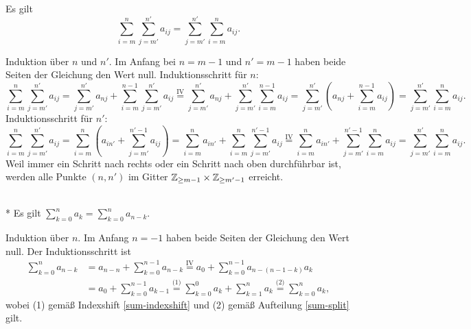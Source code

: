 \begin{Korollar} Es gilt
\[\sum_{i=m}^n \sum_{j=m'}^{n'} a_{ij} = \sum_{j=m'}^{n'}\sum_{i=m}^n a_{ij}.\]
\end{Korollar}
\begin{Beweis}
Induktion über $n$ und $n'$. Im Anfang bei $n=m-1$ und $n'=m-1$
haben beide Seiten der Gleichung den Wert null. Induktionsschritt für $n$:
\[\sum_{i=m}^n\sum_{j=m'}^{n'} a_{ij}
= \!\!\sum_{j=m'}^{n'} a_{nj}
+ \!\sum_{i=m}^{n-1}\sum_{j=m'}^{n'} a_{ij}
\stackrel{\mathrm{IV}}=
\!\sum_{j=m'}^{n'} a_{nj}
+ \!\sum_{j=m'}^{n'}\sum_{i=m}^{n-1} a_{ij}
= \!\!\sum_{j=m'}^{n'} (a_{nj}+\sum_{i=m}^{n-1} a_{ij})
= \!\!\sum_{j=m'}^{n'} \sum_{i=m}^n a_{ij}.\]
Induktionsschritt für $n'$:
\[\sum_{i=m}^n\sum_{j=m'}^{n'} a_{ij}
= \!\!\sum_{i=m}^n (a_{in'}+\!\!\sum_{j=m'}^{n'-1}a_{ij})
= \!\!\sum_{i=m}^n a_{in'}+\!\!\sum_{i=m}^n\sum_{j=m'}^{n'-1}a_{ij}
\stackrel{\mathrm{IV}}=
\!\sum_{i=m}^n a_{in'}+\sum_{j=m'}^{n'-1}\sum_{i=m}^n a_{ij}
= \!\!\sum_{j=m'}^{n'}\sum_{i=m}^n a_{ij}.\]
Weil immer ein Schritt nach rechts oder ein Schritt nach oben durchführbar ist,
werden alle Punkte $(n,n')$ im Gitter $\mathbb Z_{\ge m-1}\times\mathbb Z_{\ge m'-1}$ erreicht.\,\qedsymbol
\end{Beweis}

\begin{Korollar}\label{sum-rev}\mbox{}\\*
Es gilt $\sum_{k=0}^n a_k = \sum_{k=0}^n a_{n-k}$.
\end{Korollar}
\begin{Beweis}
Induktion über $n$. Im Anfang $n=-1$ haben beide Seiten der Gleichung
den Wert null. Der Induktionsschritt ist
\begin{align*}
\sum_{k=0}^n a_{n-k} &= a_{n-n} + \sum_{k=0}^{n-1} a_{n-k}
\stackrel{\mathrm{IV}}= a_0+\sum_{k=0}^{n-1} a_{n-(n-1-k)}a_k\\
&= a_0+\sum_{k=0}^{n-1} a_{k-1}
\stackrel{\text{(1)}}= \sum_{k=0}^0 a_k+\sum_{k=1}^n a_k
\stackrel{\text{(2)}}= \sum_{k=0}^n a_k,
\end{align*}
wobei (1) gemäß Indexshift \ref{sum-indexshift} und
(2) gemäß Aufteilung \ref{sum-split} gilt.\,\qedsymbol
\end{Beweis}

